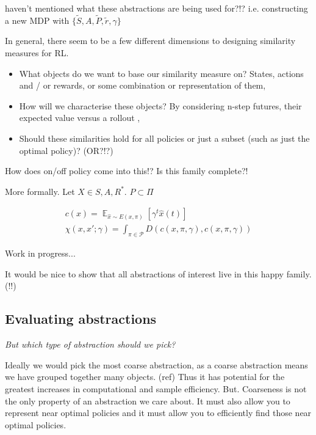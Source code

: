 {\color{red}haven't mentioned what these abstractions are being used for?!?}
i.e. constructing a new MDP with $\{\tilde S, A, \tilde P, \tilde r, \gamma\}$

In general, there seem to be a few different dimensions to designing similarity measures for RL.

\begin{itemize}
  \tightlist
  \item What objects do we want to base our similarity measure on? States, actions and / or rewards, or some combination or representation of them,
  \item How will we characterise these objects? By considering n-step futures, their expected value versus a rollout \footnotemark[9],
  \item Should these similarities hold for all policies or just a subset (such as just the optimal policy)? (OR?!?)
\end{itemize}


{\color{red}How does on/off policy come into this!? Is this family complete?!}

More formally. Let $X \in {S, A, R}^{* }$. $P \subset \Pi$

\begin{align*}
c(x) = \mathop{\mathbb E}_{\hat x \sim E(x, \pi)} [\gamma^t \hat x(t)] \\
\chi(x, x'; \gamma) = \int_{\pi \in \mathcal P} D(c(x, \pi, \gamma), c(x, \pi, \gamma))
\end{align*}

{\color{red}Work in progress...}

It would be nice to show that all abstractions of interest live in this happy family. (!!)


\subsection{Evaluating abstractions}

\begin{displayquote}
\textit{But which type of abstraction should we pick?}
\end{displayquote}

Ideally we would pick the most coarse abstraction, as a coarse abstraction means we have grouped together many objects. (ref)
Thus it has potential for the greatest increases in computational and sample efficiency.
But. Coarseness is not the only property of an abstraction we care about.
It must also allow you to represent near optimal policies and it must allow you
to efficiently find those near optimal policies.

